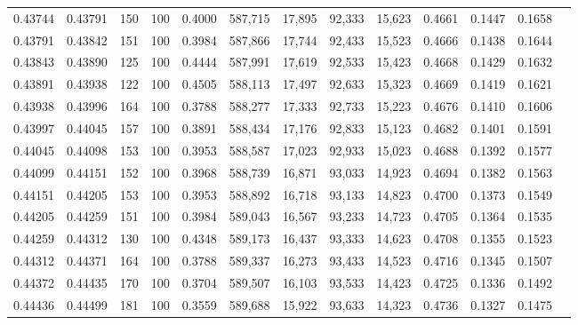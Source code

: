 \begin{tabular}{rrrrrrrrrrrrr}
0.43744 & 0.43791 &   150 & 100 &                                     0.4000 & 587,715 &  17,895 &  92,333 &  15,623 & 0.4661 & 0.1447 & 0.1658 \\
0.43791 & 0.43842 &   151 & 100 &                                     0.3984 & 587,866 &  17,744 &  92,433 &  15,523 & 0.4666 & 0.1438 & 0.1644 \\
0.43843 & 0.43890 &   125 & 100 &                                     0.4444 & 587,991 &  17,619 &  92,533 &  15,423 & 0.4668 & 0.1429 & 0.1632 \\
0.43891 & 0.43938 &   122 & 100 &                                     0.4505 & 588,113 &  17,497 &  92,633 &  15,323 & 0.4669 & 0.1419 & 0.1621 \\
0.43938 & 0.43996 &   164 & 100 &                                     0.3788 & 588,277 &  17,333 &  92,733 &  15,223 & 0.4676 & 0.1410 & 0.1606 \\
0.43997 & 0.44045 &   157 & 100 &                                     0.3891 & 588,434 &  17,176 &  92,833 &  15,123 & 0.4682 & 0.1401 & 0.1591 \\
0.44045 & 0.44098 &   153 & 100 &                                     0.3953 & 588,587 &  17,023 &  92,933 &  15,023 & 0.4688 & 0.1392 & 0.1577 \\
0.44099 & 0.44151 &   152 & 100 &                                     0.3968 & 588,739 &  16,871 &  93,033 &  14,923 & 0.4694 & 0.1382 & 0.1563 \\
0.44151 & 0.44205 &   153 & 100 &                                     0.3953 & 588,892 &  16,718 &  93,133 &  14,823 & 0.4700 & 0.1373 & 0.1549 \\
0.44205 & 0.44259 &   151 & 100 &                                     0.3984 & 589,043 &  16,567 &  93,233 &  14,723 & 0.4705 & 0.1364 & 0.1535 \\
0.44259 & 0.44312 &   130 & 100 &                                     0.4348 & 589,173 &  16,437 &  93,333 &  14,623 & 0.4708 & 0.1355 & 0.1523 \\
0.44312 & 0.44371 &   164 & 100 &                                     0.3788 & 589,337 &  16,273 &  93,433 &  14,523 & 0.4716 & 0.1345 & 0.1507 \\
0.44372 & 0.44435 &   170 & 100 &                                     0.3704 & 589,507 &  16,103 &  93,533 &  14,423 & 0.4725 & 0.1336 & 0.1492 \\
0.44436 & 0.44499 &   181 & 100 &                                     0.3559 & 589,688 &  15,922 &  93,633 &  14,323 & 0.4736 & 0.1327 & 0.1475 \\

\end{tabular}
